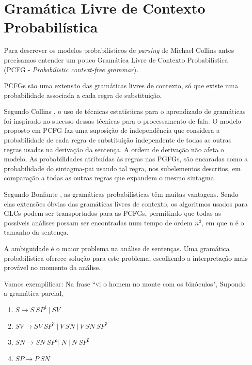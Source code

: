 \section{Gramática Livre de Contexto Probabilística}
\label{sec:pcfg}

Para descrever os modelos  probabilísticos  de \emph{parsing} de Michael Collins antes precisamos entender um pouco Gramática Livre de Contexto Probabilística (PCFG - \emph{Probabilistic context-free grammar}).

PCFGs são uma extensão das gramáticas livres de contexto, só que existe uma probabilidade associada a cada regra de substituição.

Segundo Collins \cite{collins99}, o uso de técnicas estatísticas para o aprendizado de gramáticas foi inspirado no sucesso dessas técnicas para o processamento de fala. O modelo proposto em PCFG faz uma suposição de independência que considera a probabilidade de cada regra de substituição independente de todas as outras regras usadas na derivação da sentença. A ordem de derivação não afeta o modelo. As probabilidades atribuídas às regras nas PGFGs, são encaradas como a probabilidade do sintagma-pai usando tal regra, nos subelementos descritos, em comparação a todas as outras regras que expandem o mesmo sintagma.

Segundo Bonfante \cite{bonfante03}, as gramáticas probabilísticas têm muitas vantagens. Sendo elas extensões óbvias das gramáticas livres de contexto, os algoritmos usados para GLCs podem ser transportados para as PCFGs, permitindo que todas as possíveis análises possam ser encontradas num tempo de ordem $n^3$, em que n é o tamanho da sentença.

A ambiguidade é o maior problema na análise de sentenças. Uma gramática probabilística oferece solução para este problema, escolhendo a interpretação mais provável no momento da análise.

Vamos exemplificar: Na frase ``vi o homem no monte com os binóculos", Supondo a gramática parcial,

\begin{enumerate}
  \item $ S \rightarrow S \  SP^1 \ |\ SV $
  \item $ SV \rightarrow SV \ SP^2  \ |\  V \ SN \ |\ V \ SN \ SP^3 $
  \item $ SN \rightarrow SN \ SP^4  | \  N \  |  \ N \ SP^5 $
  \item $ SP \rightarrow P \ SN  $
\end{enumerate}

